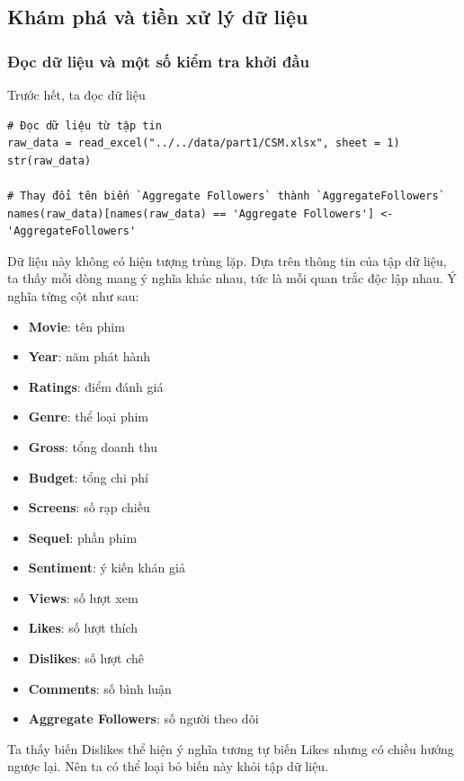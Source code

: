 \subsection{Khám phá và tiền xử lý dữ liệu}


\subsubsection{Đọc dữ liệu và một số kiểm tra khởi đầu}

Trước hết, ta đọc dữ liệu

\begin{lstlisting}
# Đọc dữ liệu từ tập tin
raw_data = read_excel("../../data/part1/CSM.xlsx", sheet = 1)
str(raw_data)

# Thay đổi tên biến `Aggregate Followers` thành `AggregateFollowers`
names(raw_data)[names(raw_data) == 'Aggregate Followers'] <- 'AggregateFollowers'
\end{lstlisting}

Dữ liệu này không có hiện tượng trùng lặp. Dựa trên thông tin của tập dữ liệu, ta thấy mỗi dòng mang ý nghĩa khác nhau, tức là mỗi quan trắc độc lập nhau. Ý nghĩa từng cột như sau:
\begin{itemize}
    \item \textbf{Movie}: tên phim
    \item \textbf{Year}: năm phát hành
    \item \textbf{Ratings}: điểm đánh giá
    \item \textbf{Genre}: thể loại phim
    \item \textbf{Gross}: tổng doanh thu
    \item \textbf{Budget}: tổng chi phí
    \item \textbf{Screens}: số rạp chiều
    \item \textbf{Sequel}: phần phim
    \item \textbf{Sentiment}: ý kiến khán giả
    \item \textbf{Views}: số lượt xem
    \item \textbf{Likes}: số lượt thích
    \item \textbf{Dislikes}: số lượt chê
    \item \textbf{Comments}: số bình luận
    \item \textbf{Aggregate Followers}: số người theo dõi
\end{itemize}

Ta thấy biến Dislikes thể hiện ý nghĩa tương tự biến Likes nhưng có chiều hướng ngược lại. Nên ta có thể loại bỏ biến này khỏi tập dữ liệu.

